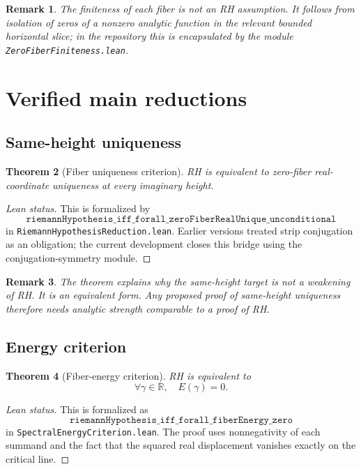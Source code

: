 \documentclass[11pt]{amsart}
\newtheorem{theorem}{Theorem}[section]
\newtheorem{remark}[theorem]{Remark}
\newcommand{\R}{\mathbb{R}}
\newcommand{\lean}[1]{\texttt{#1}}
\begin{document}
\begin{remark}
The finiteness of each fiber is not an RH assumption.  It follows from
isolation of zeros of a nonzero analytic function in the relevant bounded
horizontal slice; in the repository this is encapsulated by the module
\lean{ZeroFiberFiniteness.lean}.
\end{remark}

\section{Verified main reductions}

\subsection{Same-height uniqueness}

\begin{theorem}[Fiber uniqueness criterion]
\label{thm:fiber-unique}
RH is equivalent to zero-fiber real-coordinate uniqueness at every imaginary
height.
\end{theorem}

\begin{proof}[Lean status]
This is formalized by
\[
  \lean{riemannHypothesis\_iff\_forall\_zeroFiberRealUnique\_unconditional}
\]
in \lean{RiemannHypothesisReduction.lean}.  Earlier versions treated strip
conjugation as an obligation; the current development closes this bridge using
the conjugation-symmetry module.
\end{proof}

\begin{remark}
The theorem explains why the same-height target is not a weakening of RH.  It is
an equivalent form.  Any proposed proof of same-height uniqueness therefore
needs analytic strength comparable to a proof of RH.
\end{remark}

\subsection{Energy criterion}

\begin{theorem}[Fiber-energy criterion]
\label{thm:energy}
RH is equivalent to
\[
  \forall \gamma\in\R,\quad E(\gamma)=0.
\]
\end{theorem}

\begin{proof}[Lean status]
This is formalized as
\[
  \lean{riemannHypothesis\_iff\_forall\_fiberEnergy\_zero}
\]
in \lean{SpectralEnergyCriterion.lean}.  The proof uses nonnegativity of each
summand and the fact that the squared real displacement vanishes exactly on the
critical line.
\end{proof}
\end{document}
